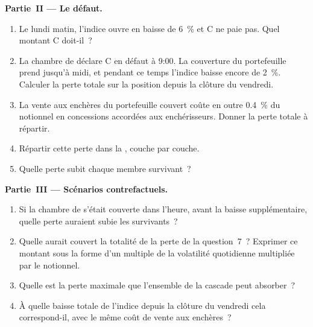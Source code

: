 \begin{problem}
\medskip\noindent\textbf{Partie~II --- Le défaut.}
\begin{enumerate}[resume]
\item Le lundi matin, l'indice ouvre en baisse de 6~\% et C ne paie pas.
Quel montant C doit-il~?
\item La chambre de  déclare C en défaut à 9:00. La couverture du
portefeuille prend jusqu'à midi, et pendant ce temps l'indice baisse encore de 2~\%.
Calculer la perte totale sur la position depuis la clôture du vendredi.
\item La vente aux enchères du portefeuille couvert coûte en outre 0.4~\% du notionnel
en concessions accordées aux enchérisseurs. Donner la perte totale à répartir.
\item Répartir cette perte dans la , couche par couche.
\item Quelle perte subit chaque membre survivant~?
\end{enumerate}

\medskip\noindent\textbf{Partie~III --- Scénarios contrefactuels.}
\begin{enumerate}[resume]
\item Si la chambre de  s'était couverte dans l'heure, avant la baisse
supplémentaire, quelle perte auraient subie les survivants~?
\item Quelle  aurait couvert la totalité de la perte de la question~7~?
Exprimer ce montant sous la forme d'un multiple de la volatilité quotidienne multipliée par le notionnel.
\item Quelle est la perte maximale que l'ensemble de la cascade peut absorber~?
\item À quelle baisse totale de l'indice depuis la clôture du vendredi cela correspond-il,
avec le même coût de vente aux enchères~?
\end{enumerate}


\end{problem}
